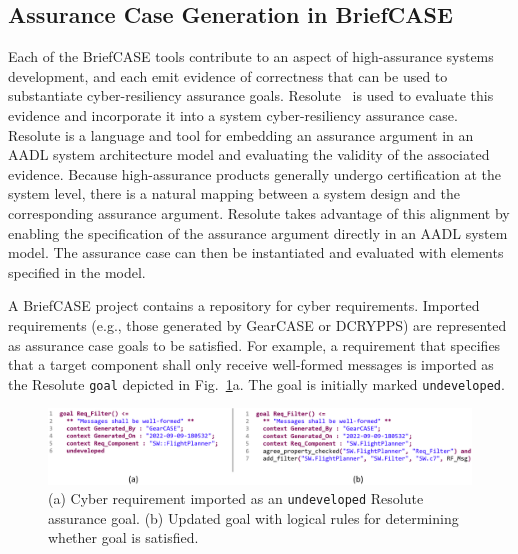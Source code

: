 \subsection{Assurance Case Generation in BriefCASE}
\label{sec:resolute}

Each of the BriefCASE tools contribute to an aspect of high-assurance systems development, and each emit evidence of correctness that can be used to substantiate cyber-resiliency assurance goals. Resolute~\cite{resolute2014} is used to evaluate this evidence and incorporate it into a system cyber-resiliency assurance case. 
%
Resolute is a language and tool for embedding an assurance argument in an AADL system architecture model and evaluating the validity of the associated evidence. 
Because high-assurance products generally undergo certification at the system level, there is a natural mapping between a system design and the corresponding assurance argument. Resolute takes advantage of this alignment by enabling the specification of the assurance argument directly in an AADL system model. The assurance case can then be instantiated and evaluated with elements specified in the model.

A BriefCASE project contains a repository for cyber requirements. Imported requirements (e.g., those generated by GearCASE or DCRYPPS) are represented as assurance case goals to be satisfied. 
For example, a requirement that specifies that a target component shall only receive well-formed messages is imported as the Resolute \texttt{goal} depicted in Fig.~\ref{fig:resolute-requirement}a.  The goal is initially marked \texttt{undeveloped}.

\begin{figure}[h] 
	\centering 
	\includegraphics[width=\textwidth]{figs/resolute-requirement.png}
	\caption{(a) Cyber requirement imported as an \texttt{undeveloped} Resolute assurance goal.  (b) Updated goal with logical rules for determining whether goal is satisfied.}
	\label{fig:resolute-requirement} 
\end{figure}

